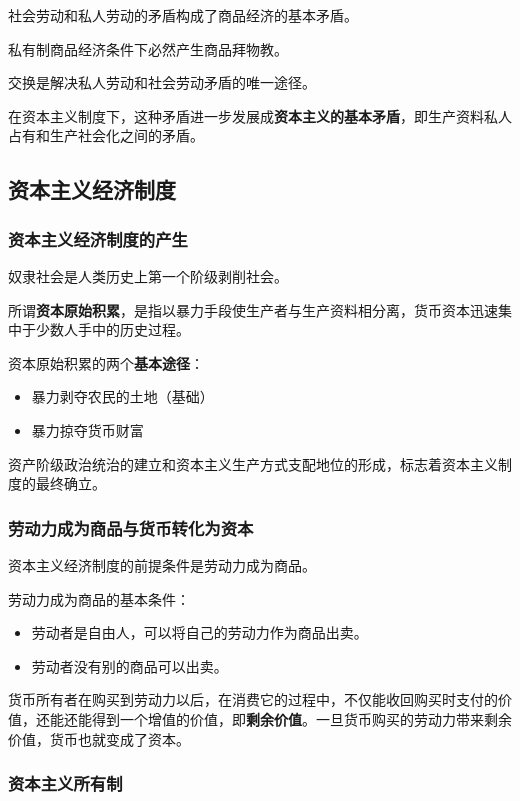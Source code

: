 \documentclass[12pt, a4paper, oneside]{ctexart}
\begin{document}
社会劳动和私人劳动的矛盾构成了商品经济的基本矛盾。

私有制商品经济条件下必然产生商品拜物教。

交换是解决私人劳动和社会劳动矛盾的唯一途径。

在资本主义制度下，这种矛盾进一步发展成\textbf{资本主义的基本矛盾}，即生产资料私人占有和生产社会化之间的矛盾。

\subsection{资本主义经济制度}

\subsubsection{资本主义经济制度的产生}

奴隶社会是人类历史上第一个阶级剥削社会。

所谓\textbf{资本原始积累}，是指以暴力手段使生产者与生产资料相分离，货币资本迅速集中于少数人手中的历史过程。

资本原始积累的两个\textbf{基本途径}：
\begin{itemize}
  \item 暴力剥夺农民的土地（基础）
  \item 暴力掠夺货币财富
\end{itemize}

资产阶级政治统治的建立和资本主义生产方式支配地位的形成，标志着资本主义制度的最终确立。

\subsubsection{劳动力成为商品与货币转化为资本}

资本主义经济制度的前提条件是劳动力成为商品。

劳动力成为商品的基本条件：
\begin{itemize}
  \item 劳动者是自由人，可以将自己的劳动力作为商品出卖。
  \item 劳动者没有别的商品可以出卖。
\end{itemize}

货币所有者在购买到劳动力以后，在消费它的过程中，不仅能收回购买时支付的价值，还能还能得到一个增值的价值，即\textbf{剩余价值}。一旦货币购买的劳动力带来剩余价值，货币也就变成了资本。

\subsubsection{资本主义所有制}
\end{document}
